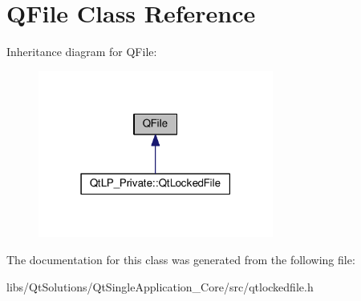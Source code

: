 \hypertarget{class_q_file}{}\section{Q\+File Class Reference}
\label{class_q_file}


Inheritance diagram for Q\+File\+:
\nopagebreak
\begin{figure}[H]
\begin{center}
\leavevmode
\includegraphics[width=219pt]{class_q_file__inherit__graph}
\end{center}
\end{figure}


The documentation for this class was generated from the following file\+:\begin{DoxyCompactItemize}
\item 
libs/\+Qt\+Solutions/\+Qt\+Single\+Application\+\_\+\+Core/src/qtlockedfile.\+h\end{DoxyCompactItemize}

